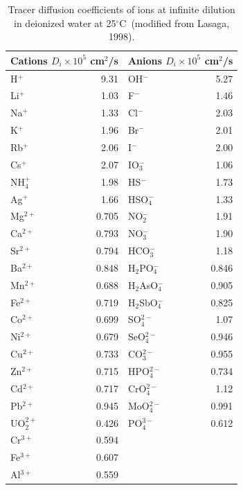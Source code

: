 \documentclass[12pt]{article}
\newcommand{\degc}{$^\circ$C}
\begin{document}
\begin{table}[t]\centering
\parbox{4.5in}{\caption{Tracer diffusion coefficients of ions at infinite dilution in deionized water at 25\degc\ (modified from Lasaga, 1998).}\label{tdiff}}

\vspace{5mm}

\begin{tabular}{lrlr}
\toprule
\multicolumn{2}{c}{Cations $D_i\!\times\! 10^5$ cm$^2$/s} & \multicolumn{2}{c}{Anions $D_i\!\times\! 10^5$ cm$^2$/s} \\
\midrule
H$^+$ & 9.31 & OH$^-$ & 5.27 \\
Li$^+$ & 1.03 & F$^-$ & 1.46 \\
Na$^+$ & 1.33 & Cl$^-$ & 2.03 \\
K$^+$ & 1.96 & Br$^-$ & 2.01 \\
Rb$^+$ & 2.06 & I$^-$ & 2.00 \\
Cs$^+$ & 2.07 & IO$_3^-$ & 1.06 \\
NH$_4^{+}$ & 1.98 & HS$^-$ & 1.73 \\
Ag$^+$ & 1.66 & HSO$_4^-$ & 1.33 \\
Mg$^{2+}$ & 0.705 & NO$_2^-$ & 1.91 \\
Ca$^{2+}$ & 0.793 & NO$_3^-$ & 1.90 \\
Sr$^{2+}$ & 0.794 & HCO$_3^-$ & 1.18 \\
Ba$^{2+}$ & 0.848 & H$_2$PO$_4^-$ & 0.846 \\
Mn$^{2+}$ & 0.688 & H$_2$AsO$_4^-$ & 0.905 \\
Fe$^{2+}$ & 0.719 & H$_2$SbO$_4^-$ & 0.825 \\
Co$^{2+}$ & 0.699 & SO$_4^{2-}$ & 1.07 \\
Ni$^{2+}$ & 0.679 & SeO$_4^{2-}$ & 0.946 \\
Cu$^{2+}$ & 0.733 & CO$_3^{2-}$ & 0.955 \\
Zn$^{2+}$ & 0.715 & HPO$_4^{2-}$ & 0.734 \\
Cd$^{2+}$ & 0.717 & CrO$_4^{2-}$ & 1.12 \\
Pb$^{2+}$ & 0.945 & MoO$_4^{2-}$ & 0.991 \\
UO$_2^{2+}$ & 0.426 & PO$_4^{3-}$ & 0.612 \\
Cr$^{3+}$ & 0.594 \\
Fe$^{3+}$ & 0.607 \\
Al$^{3+}$ & 0.559\\
\bottomrule
\end{tabular}
\end{table}
\end{document}
